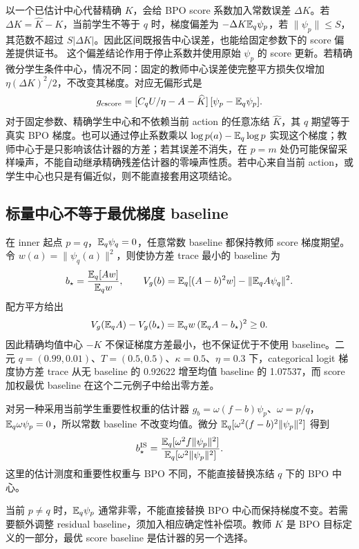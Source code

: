 以一个已估计中心代替精确 $K$，会给 BPO score 系数加入常数误差 $\Delta K$。若 $\Delta K=\widehat K-K$，当前学生不等于 $q$ 时，梯度偏差为 $-\Delta K\mathbb E_q\psi_p$，若 $\|\psi_p\|\le S$，其范数不超过 $S|\Delta K|$。因此区间既报告中心误差，也能给固定参数下的 score 偏差提供证书。 这个偏差结论作用于停止系数并使用原始 $\psi_p$ 的 score 更新。若精确微分学生条件中心，情况不同：固定的教师中心误差使完整平方损失仅增加 $\eta(\Delta K)^2/2$，不改变其梯度。对应无偏形式是
\begin{equation}
 g_{\mathrm{cscore}}=
 [C_qU/\eta-A-\widehat K]\,[\psi_p-\mathbb E_q\psi_p].
\end{equation}
对于固定参数、精确学生中心和不依赖当前 action 的任意冻结 $\widehat K$，其 $q$ 期望等于真实 BPO 梯度。也可以通过停止系数乘以 $\log p(a)-\mathbb E_q\log p$ 实现这个梯度；教师中心于是只影响该估计器的方差；若其误差不消失，在 $p=m$ 处仍可能保留采样噪声，不能自动继承精确残差估计器的零噪声性质。若中心来自当前 action，或学生中心也只是有偏近似，则不能直接套用这项结论。
\subsection{标量中心不等于最优梯度 baseline}

在 inner 起点 $p=q$，$\mathbb E_q\psi_q=0$，任意常数 baseline 都保持教师 score 梯度期望。令 $w(a)=\|\psi_q(a)\|^2$，则使协方差 trace 最小的 baseline 为
\begin{equation}
 b_\star=\frac{\mathbb E_q[A w]}{\mathbb E_qw},\qquad
 V_g(b)=\mathbb E_q[(A-b)^2w]-\|\mathbb E_qA\psi_q\|^2.
\end{equation}
配方平方给出
\begin{equation}
 V_g(\mathbb E_qA)-V_g(b_\star)
 =\mathbb E_qw\,(\mathbb E_qA-b_\star)^2\ge0.
\end{equation}
因此精确均值中心 $-K$ 不保证梯度方差最小，也不保证优于不使用 baseline。二元 $q=(0.99,0.01)$、$T=(0.5,0.5)$、$\kappa=0.5$、$\eta=0.3$ 下，categorical logit 梯度协方差 trace 从无 baseline 的 0.92622 增至均值 baseline 的 1.07537，而 score 加权最优 baseline 在这个二元例子中给出零方差。

对另一种采用当前学生重要性权重的估计器 $g_b=\omega(f-b)\psi_p$、$\omega=p/q$，$\mathbb E_q\omega\psi_p=0$，所以常数 baseline 不改变均值。微分 $\mathbb E_q[\omega^2(f-b)^2\|\psi_p\|^2]$ 得到
\begin{equation}
 b_\star^{\mathrm{IS}}
 =\frac{\mathbb E_q[\omega^2f\|\psi_p\|^2]}{\mathbb E_q[\omega^2\|\psi_p\|^2]}.
\end{equation}
这里的估计测度和重要性权重与 BPO 不同，不能直接替换冻结 $q$ 下的 BPO 中心。

当前 $p\ne q$ 时，$\mathbb E_q\psi_p$ 通常非零，不能直接替换 BPO 中心而保持梯度不变。若需要额外调整 residual baseline，须加入相应确定性补偿项。教师 $K$ 是 BPO 目标定义的一部分，最优 score baseline 是估计器的另一个选择。

